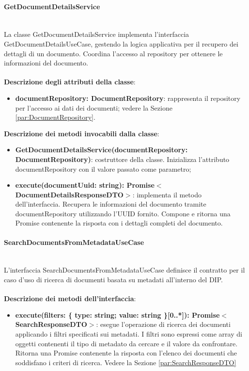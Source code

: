 \documentclass[a4paper,12pt]{article}
\begin{document}
{{{                \paragraph{GetDocumentDetailsService}\label{par:GetDocumentDetailsService}\mbox{}\\
                La classe GetDocumentDetailsService implementa l'interfaccia GetDocumentDetailsUseCase, gestendo la logica applicativa per il recupero dei dettagli di un documento. Coordina l'accesso al repository per ottenere le informazioni del documento.\\
                \\
                \textbf{Descrizione degli attributi della classe}:
                \begin{itemize}
                    \item \textbf{documentRepository: DocumentRepository}: rappresenta il repository per l'accesso ai dati dei documenti; vedere la Sezione \ref{par:DocumentRepository}.
                \end{itemize}
                
              \noindent \textbf{Descrizione dei metodi invocabili dalla classe}:
                \begin{itemize}
                    \item \textbf{GetDocumentDetailsService(documentRepository: DocumentRepository)}: costruttore della classe. Inizializza l'attributo documentRepository con il valore passato come parametro;
                    \item \textbf{execute(documentUuid: string): Promise$<$DocumentDetailsResponseDTO$>$}: implementa il metodo dell'interfaccia. Recupera le informazioni del documento tramite documentRepository utilizzando l'UUID fornito. Compone e ritorna una Promise contenente la risposta con i dettagli completi del documento.
                \end{itemize}
                \paragraph{SearchDocumentsFromMetadataUseCase}\label{par:SearchDocumentsFromMetadataUseCase}\mbox{}\\
                L'interfaccia SearchDocumentsFromMetadataUseCase definisce il contratto per il caso d'uso di ricerca di documenti basata su metadati all'interno del DIP.\\
                \\
              \noindent \textbf{Descrizione dei metodi dell'interfaccia}:
                \begin{itemize}
                    \item \textbf{execute(filters: \{ type: string; value: string \}[0..*]): Promise$<$SearchResponseDTO$>$}: esegue l'operazione di ricerca dei documenti applicando i filtri specificati sui metadati. I filtri sono espressi come array di oggetti contenenti il tipo di metadato da cercare e il valore da confrontare. Ritorna una Promise contenente la risposta con l'elenco dei documenti che soddisfano i criteri di ricerca. Vedere la Sezione \ref{par:SearchResponseDTO}
                \end{itemize}
}}}
\end{document}
